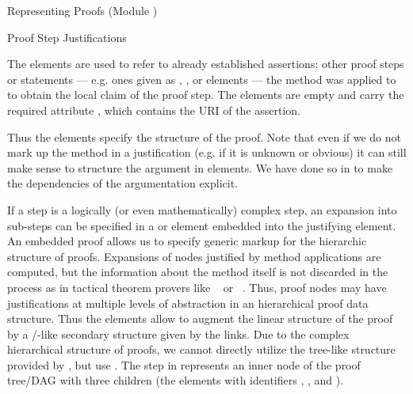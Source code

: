\begin{omgroup}[id=proofs,short=Representing Proofs]{Representing Proofs (Module {})}
\begin{module}[id=justifications]
\begin{omgroup}[id=proofs.justifications]{Proof Step Justifications}
\begin{definition}[id=premise.def]
  The {} elements are used to refer to already established assertions:
  other proof steps or statements --- e.g. ones given as {},
  {}, or {} elements --- the method was applied to to
  obtain the local claim of the proof step. The {} elements are empty and
  carry the required attribute {}, which contains the URI of the
  assertion.
\end{definition}
Thus the {} elements specify the {} structure of the
proof. Note that even if we do not mark up the method in a justification (e.g. if it is
unknown or obvious) it can still make sense to structure the argument in
{} elements. We have done so in {} to make
the dependencies of the argumentation explicit.
  
  If a {} step is a logically (or even mathematically) complex step, an
  expansion into sub-steps can be specified in a {} or
  {} element embedded into the justifying {} element.
  An embedded proof allows us to specify generic markup for the hierarchic structure of
  proofs. Expansions of nodes justified by method applications are computed, but the
  information about the method itself is not discarded in the process as in tactical
  theorem provers like {\isabelle}~\cite{Paulson:iagtp94} or {\nuprl}~\cite{Constable86}.
  Thus, proof nodes may have justifications at multiple levels of abstraction in an
  hierarchical proof data structure.  Thus the {} elements allow to
  augment the linear structure of the proof by a {}/{}-like
  secondary structure given by the {} links. Due to the complex
  hierarchical structure of proofs, we cannot directly utilize the tree-like structure
  provided by {\xml}, but use .  The
  {} step in {} represents an inner node of the proof
  tree/DAG with three children (the elements with identifiers {},
  {}, and {}).


\end{omgroup}
\end{module}
\end{omgroup}
